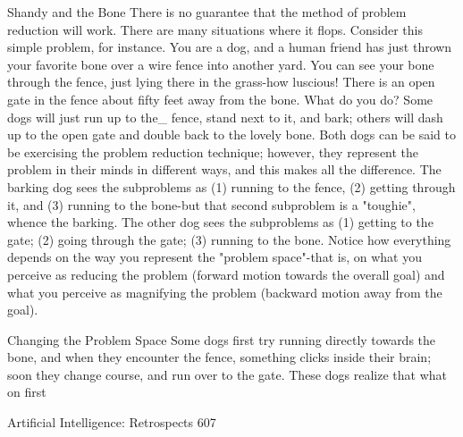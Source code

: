 {                                Shandy and the Bone
     There is no guarantee that the method of problem reduction will work. There are
many situations where it flops. Consider this simple problem, for instance. You are a dog,
and a human friend has just thrown your favorite bone over a wire fence into another
yard. You can see your bone through the fence, just lying there in the grass-how luscious!
There is an open gate in the fence about fifty feet away from the bone. What do you do?
Some dogs will just run up to the\_ fence, stand next to it, and bark; others will dash up to
the open gate and double back to the lovely bone. Both dogs can be said to be exercising
the problem reduction technique; however, they represent the problem in their minds in
different ways, and this makes all the difference. The barking dog sees the subproblems
as (1) running to the fence, (2) getting through it, and (3) running to the bone-but that
second subproblem is a "toughie", whence the barking. The other dog sees the
subproblems as (1) getting to the gate; (2) going through the gate; (3) running to the
bone. Notice how everything depends on the way you represent the "problem space"-that
is, on what you perceive as reducing the problem (forward motion towards the overall
goal) and what you perceive as magnifying the problem (backward motion away from the
goal).

                           Changing the Problem Space
Some dogs first try running directly towards the bone, and when they encounter the
fence, something clicks inside their brain; soon they change course, and run over to the
gate. These dogs realize that what on first




Artificial Intelligence: Retrospects                                                     607

}
